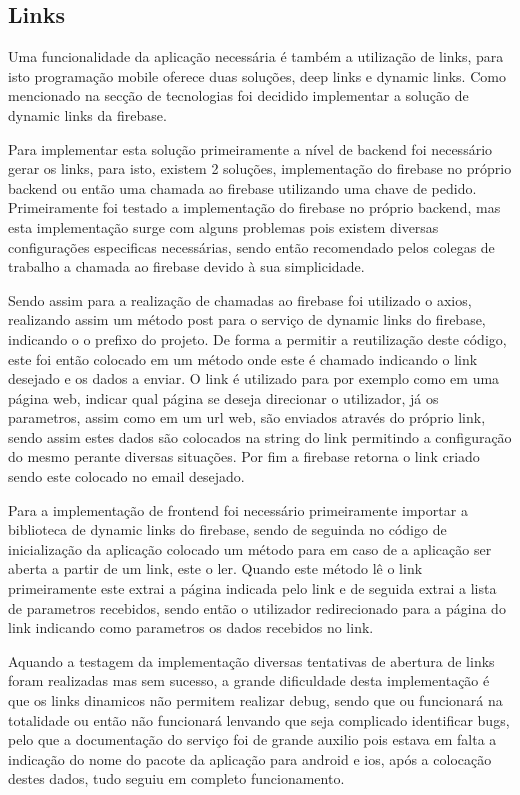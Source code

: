 \subsection{Links}
Uma funcionalidade da aplicação necessária é também a utilização de links, para isto programação mobile oferece duas soluções, deep links e dynamic links. Como mencionado na secção de tecnologias foi decidido implementar a solução de dynamic links da firebase.

Para implementar esta solução primeiramente a nível de backend foi necessário gerar os links, para isto, existem 2 soluções, implementação do firebase no próprio backend ou então uma chamada ao firebase utilizando uma chave de pedido. Primeiramente foi testado a implementação do firebase no próprio backend, mas esta implementação surge com alguns problemas pois existem diversas configurações especificas necessárias, sendo então recomendado pelos colegas de trabalho a chamada ao firebase devido à sua simplicidade.

Sendo assim para a realização de chamadas ao firebase foi utilizado o axios, realizando assim um método post para o serviço de dynamic links do firebase, indicando o o prefixo do projeto. De forma a permitir a reutilização deste código, este foi então colocado em um método onde este é chamado indicando o link desejado e os dados a enviar. O link é utilizado para por exemplo como em uma página web, indicar qual página se deseja direcionar o utilizador, já os parametros, assim como em um url web, são enviados através do próprio link, sendo assim estes dados são colocados na string do link permitindo a configuração do mesmo perante diversas situações. Por fim a firebase retorna o link criado sendo este colocado no email desejado.

Para a implementação de frontend foi necessário primeiramente importar a biblioteca de dynamic links do firebase, sendo de seguinda no código de inicialização da aplicação colocado um método para em caso de a aplicação ser aberta a partir de um link, este o ler. Quando este método lê o link primeiramente este extrai a página indicada pelo link e de seguida extrai a lista de parametros recebidos, sendo então o utilizador redirecionado para a página do link indicando como parametros os dados recebidos no link.

Aquando a testagem da implementação diversas tentativas de abertura de links foram realizadas mas sem sucesso, a grande dificuldade desta implementação é que os links dinamicos não permitem realizar debug, sendo que ou funcionará na totalidade ou então não funcionará lenvando que seja complicado identificar bugs, pelo que a documentação do serviço foi de grande auxilio pois estava em falta a indicação do nome do pacote da aplicação para android e ios, após a colocação destes dados, tudo seguiu em completo funcionamento.